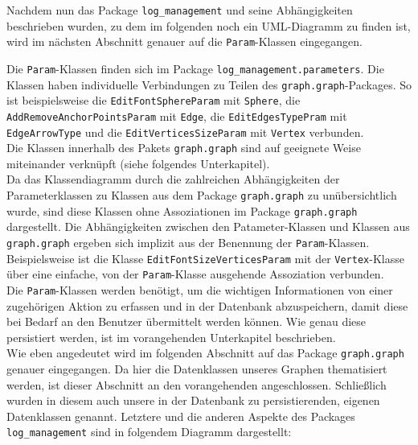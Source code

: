 \documentclass[enabledeprecatedfontcommands,fontsize=11pt,paper=a4,twoside]{scrartcl}
\newcounter{one}
\begin{document}
	Nachdem nun das Package \texttt{log\_management} und seine Abhängigkeiten beschrieben wurden, zu dem im folgenden noch ein UML-Diagramm zu finden ist, wird im nächsten Abschnitt genauer auf die \texttt{Param}-Klassen eingegangen.
	
	
	
	
	
	Die \texttt{Param}-Klassen finden sich im Package \texttt{log\_management.parameters}. 
	Die Klassen haben individuelle Verbindungen zu Teilen des \texttt{graph.graph}-Packages. So ist beispielsweise die \texttt{EditFontSphereParam} mit \texttt{Sphere}, die \texttt{AddRemoveAnchorPointsParam} mit \texttt{Edge}, die \texttt{EditEdgesTypePram} mit \texttt{EdgeArrowType} und die \texttt{EditVerticesSizeParam} mit \texttt{Vertex} verbunden. \\
	Die Klassen innerhalb des Pakets \texttt{graph.graph} sind auf geeignete Weise miteinander verknüpft (siehe folgendes Unterkapitel). \\ 
	Da das Klassendiagramm durch die zahlreichen Abhängigkeiten der Parameterklassen zu Klassen aus dem Package \texttt{graph.graph} zu unübersichtlich wurde, sind diese Klassen ohne Assoziationen im Package \texttt{graph.graph} dargestellt. Die Abhängigkeiten zwischen den Patameter-Klassen und Klassen aus \texttt{graph.graph} ergeben sich implizit aus der Benennung der \texttt{Param}-Klassen. Beispielsweise ist die Klasse \texttt{EditFontSizeVerticesParam} mit der \texttt{Vertex}-Klasse über eine einfache, von der \texttt{Param}-Klasse ausgehende Assoziation verbunden. \\
	
	Die \texttt{Param}-Klassen werden benötigt, um die wichtigen Informationen von einer zugehörigen Aktion zu erfassen und in der Datenbank abzuspeichern, damit diese bei Bedarf an den Benutzer übermittelt werden können. Wie genau diese persistiert werden, ist im vorangehenden Unterkapitel beschrieben.\\
	
	Wie eben angedeutet wird im folgenden Abschnitt auf das Package \texttt{graph.graph} genauer eingegangen. Da hier die Datenklassen unseres Graphen thematisiert werden, ist dieser Abschnitt an den vorangehenden angeschlossen. Schließlich wurden in diesem auch unsere in der Datenbank zu persistierenden, eigenen Datenklassen genannt. Letztere und die anderen Aspekte des Packages \texttt{log\_management} sind in folgendem Diagramm dargestellt:
	
\end{document}
